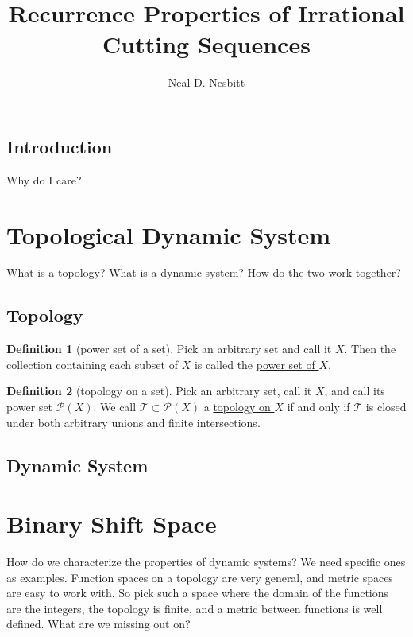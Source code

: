 \documentclass{article}
\title{Recurrence Properties of Irrational Cutting Sequences}
\author{Neal D. Nesbitt}
\begin{document}
\maketitle

\theoremstyle{definition}
\newtheorem{definition}{Definition}[subsection]

\subsection{Introduction}

Why do I care?

\section{Topological Dynamic System}

What is a topology? What is a dynamic system? How do the two work together?

\subsection{Topology}

\begin{definition}[power set of a set]\label{powerset}
Pick an arbitrary set and call it $X$. Then the collection containing each subset of $X$ is called the \underline{power set of $X$}.
\end{definition}

\begin{definition}[topology on a set]\label{topology}
Pick an arbitrary set, call it $X$, and call its power set $\mathcal{P}(X)$. We call $\mathcal{T}\subset\mathcal{P}(X)$ a \underline{topology on $X$} if and only if $\mathcal{T}$ is closed under both arbitrary unions and finite intersections.
\end{definition}

\subsection{Dynamic System}

\section{Binary Shift Space}

How do we characterize the properties of dynamic systems? We need specific ones as examples. Function spaces on a topology are very general, and metric spaces are easy to work with. So pick such a space where the domain of the functions are the integers, the topology is finite, and a metric between functions is well defined. What are we missing out on?
\end{document}
